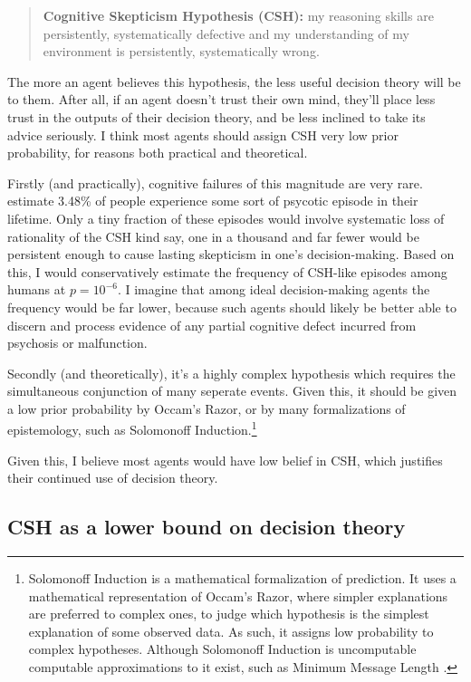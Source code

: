 \documentclass{article}
\begin{document}
\begin{quote}
\textbf{Cognitive Skepticism Hypothesis (CSH):} my reasoning skills are persistently, systematically defective and my understanding of my environment is persistently, systematically wrong.
\end{quote}

\noindent
The more an agent believes this hypothesis, the less useful decision theory will be to them. After all, if an agent doesn't trust their own mind, they'll place less trust in the outputs of their decision theory, and be less inclined to take its advice seriously. I think most agents should assign CSH very low prior probability, for reasons both practical and theoretical.

Firstly (and practically), cognitive failures of this magnitude are very rare. \citet{perala2007lifetime} estimate 3.48\% of people experience some sort of psycotic episode in their lifetime. Only a tiny fraction of these episodes would involve systematic loss of rationality of the CSH kind \textemdash{} say, one in a thousand \textemdash{} and far fewer would be persistent enough to cause lasting skepticism in one's decision-making. Based on this, I would conservatively estimate the frequency of CSH-like episodes among humans at \(p = 10^{-6}\). I imagine that among ideal decision-making agents the frequency would be far lower, because such agents should likely be better able to discern and process evidence of any partial cognitive defect incurred from psychosis or malfunction. 

Secondly (and theoretically), it's a highly complex hypothesis which requires the simultaneous conjunction of many seperate events. Given this, it should be given a low prior probability by Occam's Razor, or by many formalizations of epistemology, such as Solomonoff Induction.\footnote{Solomonoff Induction \citep{solomonoff1964formal} is a mathematical formalization of prediction. It uses a mathematical representation of Occam's Razor, where simpler explanations are preferred to complex ones, to judge which hypothesis is the simplest explanation of some observed data. As such, it assigns low probability to complex hypotheses. Although Solomonoff Induction is uncomputable computable approximations to it exist, such as Minimum Message Length \citep{wallace1999minimum}.}

Given this, I believe most agents would have low belief in CSH, which justifies their continued use of decision theory.

\subsection{CSH as a lower bound on decision theory}
\end{document}
